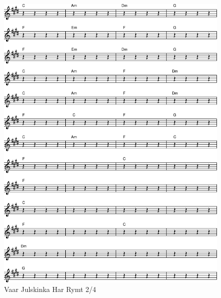 \begin{figure}[!htbp]
  \includegraphics[width=\textwidth,height=\textheight,keepaspectratio]{../songs/xx_vaar_julskinka_har_rymt-1.png}
  \caption{Vaar Julskinka Har Rymt 2/4}
  \label{fig:xx_vaar_julskinka_har_rymt_2}
\end{figure}

